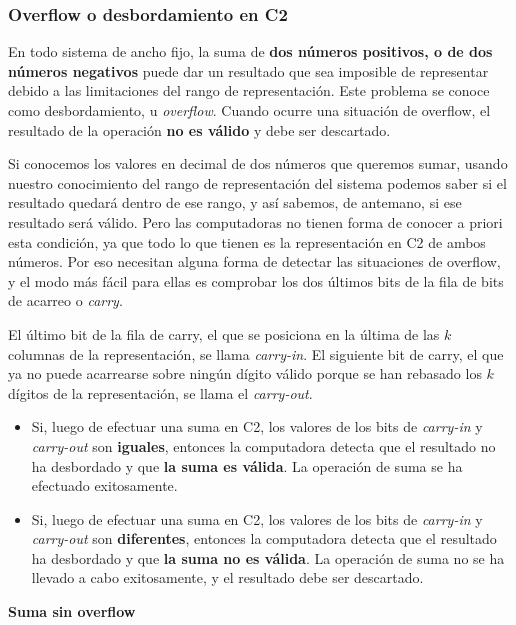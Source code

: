\documentclass[spanish,A4,]{article}
\begin{document}
\subsubsection{Overflow o desbordamiento en
C2}\label{overflow-o-desbordamiento-en-c2}

En todo sistema de ancho fijo, la suma de \textbf{dos números positivos,
o de dos números negativos} puede dar un resultado que sea imposible de
representar debido a las limitaciones del rango de representación. Este
problema se conoce como desbordamiento, u \emph{overflow}. Cuando ocurre
una situación de overflow, el resultado de la operación \textbf{no es
válido} y debe ser descartado.

Si conocemos los valores en decimal de dos números que queremos sumar,
usando nuestro conocimiento del rango de representación del sistema
podemos saber si el resultado quedará dentro de ese rango, y así
sabemos, de antemano, si ese resultado será válido. Pero las
computadoras no tienen forma de conocer a priori esta condición, ya que
todo lo que tienen es la representación en C2 de ambos números. Por eso
necesitan alguna forma de detectar las situaciones de overflow, y el
modo más fácil para ellas es comprobar los dos últimos bits de la fila
de bits de acarreo o \emph{carry}.

El último bit de la fila de carry, el que se posiciona en la última de
las $k$ columnas de la representación, se llama \emph{carry-in}. El
siguiente bit de carry, el que ya no puede acarrearse sobre ningún
dígito válido porque se han rebasado los $k$ dígitos de la
representación, se llama el \emph{carry-out}.

\begin{itemize}
\itemsep1pt\parskip0pt
\item
  Si, luego de efectuar una suma en C2, los valores de los bits de
  \emph{carry-in} y \emph{carry-out} son \textbf{iguales}, entonces la
  computadora detecta que el resultado no ha desbordado y que \textbf{la
  suma es válida}. La operación de suma se ha efectuado exitosamente.
\item
  Si, luego de efectuar una suma en C2, los valores de los bits de
  \emph{carry-in} y \emph{carry-out} son \textbf{diferentes}, entonces
  la computadora detecta que el resultado ha desbordado y que \textbf{la
  suma no es válida}. La operación de suma no se ha llevado a cabo
  exitosamente, y el resultado debe ser descartado.
\end{itemize}

\textbf{Suma sin overflow}
\end{document}
